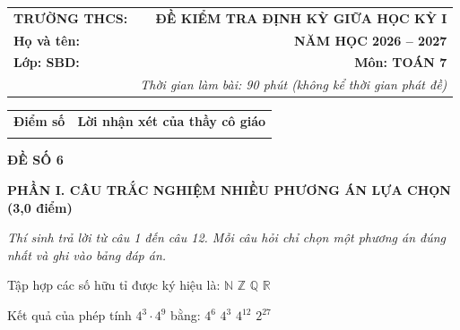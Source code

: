 \documentclass[12pt,a4paper]{article}
\begin{document}
\noindent
\begin{tabularx}{\linewidth}{X r}
\textbf{TRƯỜNG THCS: \dotfill} & \textbf{ĐỀ KIỂM TRA ĐỊNH KỲ GIỮA HỌC KỲ I} \\
\textbf{Họ và tên: \dotfill} & \textbf{NĂM HỌC 2026 -- 2027} \\
\textbf{Lớp: \dotfill \quad SBD: \dotfill} & \textbf{Môn: TOÁN 7} \\
& \textit{Thời gian làm bài: 90 phút (không kể thời gian phát đề)}
\end{tabularx}

\vspace{1.5mm}
\noindent
\begin{tabularx}{\linewidth}{|p{3.5cm}|X|}
\hline
\centering\textbf{Điểm số} & \centering\textbf{Lời nhận xét của thầy cô giáo} \tabularnewline
\rule{0pt}{1.6cm} & \\
\hline
\end{tabularx}

\vspace{2.5mm}
\begin{center}
\textbf{\large ĐỀ SỐ 6}
\end{center}

\noindent\textbf{\large PHẦN I. CÂU TRẮC NGHIỆM NHIỀU PHƯƠNG ÁN LỰA CHỌN (3,0 điểm)}

\textit{Thí sinh trả lời từ câu 1 đến câu 12. Mỗi câu hỏi chỉ chọn một phương án đúng nhất và ghi vào bảng đáp án.}

\vspace{1mm}
\begin{ex}
Tập hợp các số hữu tỉ được ký hiệu là:
\choice
{$\mathbb{N}$}
{$\mathbb{Z}$}
{\True $\mathbb{Q}$}
{$\mathbb{R}$}
\end{ex}

\begin{ex}
Kết quả của phép tính $4^3 \cdot 4^9$ bằng:
\choice
{$4^6$}
{$4^3$}
{\True $4^{12}$}
{$2^{27}$}
\end{ex}

\begin{ex}
\end{ex}
\end{document}
